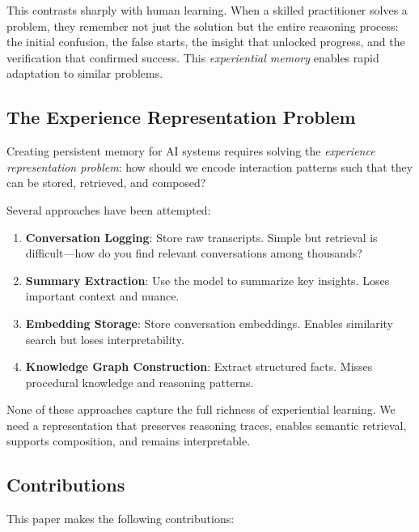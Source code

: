 \documentclass[11pt,letterpaper]{article}
\begin{document}
This contrasts sharply with human learning. When a skilled practitioner solves a problem, they remember not just the solution but the entire reasoning process: the initial confusion, the false starts, the insight that unlocked progress, and the verification that confirmed success. This \emph{experiential memory} enables rapid adaptation to similar problems.

\subsection{The Experience Representation Problem}

Creating persistent memory for AI systems requires solving the \emph{experience representation problem}: how should we encode interaction patterns such that they can be stored, retrieved, and composed?

Several approaches have been attempted:

\begin{enumerate}
    \item \textbf{Conversation Logging}: Store raw transcripts. Simple but retrieval is difficult---how do you find relevant conversations among thousands?

    \item \textbf{Summary Extraction}: Use the model to summarize key insights. Loses important context and nuance.

    \item \textbf{Embedding Storage}: Store conversation embeddings. Enables similarity search but loses interpretability.

    \item \textbf{Knowledge Graph Construction}: Extract structured facts. Misses procedural knowledge and reasoning patterns.
\end{enumerate}

None of these approaches capture the full richness of experiential learning. We need a representation that preserves reasoning traces, enables semantic retrieval, supports composition, and remains interpretable.

\subsection{Contributions}

This paper makes the following contributions:
\end{document}

